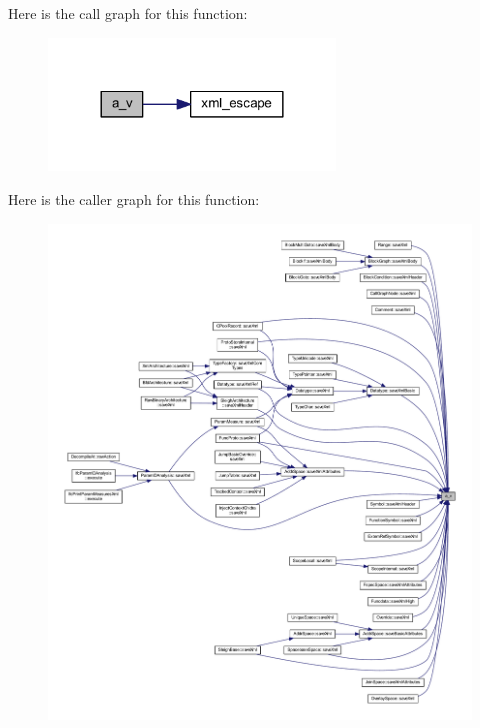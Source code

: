 Here is the call graph for this function\+:
\nopagebreak
\begin{figure}[H]
\begin{center}
\leavevmode
\includegraphics[width=216pt]{xml_8hh_a0fa1b18d881c70abd1489da2ba2f6792_cgraph}
\end{center}
\end{figure}
Here is the caller graph for this function\+:
\nopagebreak
\begin{figure}[H]
\begin{center}
\leavevmode
\includegraphics[width=350pt]{xml_8hh_a0fa1b18d881c70abd1489da2ba2f6792_icgraph}
\end{center}
\end{figure}
\mbox{\label{xml_8hh_a87634423f394bc832a51957ee6fc85c9}} 

